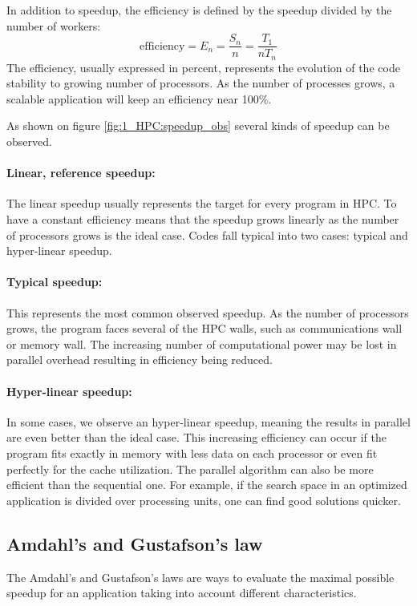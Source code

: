 In addition to speedup, the efficiency is defined by the speedup divided by the number of workers: 
\begin{equation}
\text{efficiency} = E_n = \frac{S_n}{n} = \frac{T_1}{nT_n}
\end{equation}
The efficiency, usually expressed in percent, represents the evolution of the code stability to growing number of processors. 
As the number of processes grows, a scalable application will keep an efficiency near 100\%.


As shown on figure \ref{fig:1_HPC:speedup_obs} several kinds of speedup can be observed. 
\paragraph{Linear, reference speedup: }
The linear speedup usually represents the target for every program in HPC. 
To have a constant efficiency means that the speedup grows linearly as the number of processors grows is the ideal case. 
Codes fall typical into two cases: typical and hyper-linear speedup. 
\paragraph{Typical speedup: }
This represents the most common observed speedup. 
As the number of processors grows, the program faces several of the HPC walls, such as communications wall or memory wall. 
The increasing number of computational power may be lost in parallel overhead resulting in efficiency being reduced. 
\paragraph{Hyper-linear speedup: }
In some cases, we observe an hyper-linear speedup, meaning the results in parallel are even better than the ideal case. 
This increasing efficiency can occur if the program fits exactly in memory with less data on each processor or even fit perfectly for the cache utilization. 
The parallel algorithm can also be more efficient than the sequential one.
For example, if the search space in an optimized application is divided over processing units, one can find good solutions quicker.

\subsection{Amdahl's and Gustafson's law}
The Amdahl's and Gustafson's laws are ways to evaluate the maximal possible speedup for an application taking into account different characteristics. 

